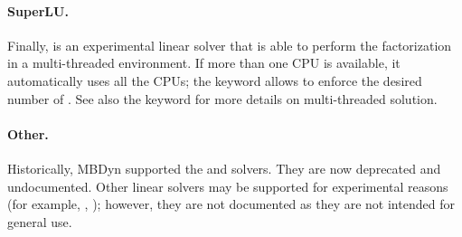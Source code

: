 \paragraph{SuperLU.}
Finally,  is an experimental linear solver that is able to perform
the factorization in a multi-threaded environment.
If more than one CPU is available, it automatically uses all the CPUs;
the keyword  allows to enforce the desired number of .
See also the  keyword for more details on multi-threaded
solution.

\begin{comment}
Another linear solver, that is available mostly for historical reasons, 
is \kw{harwell}, with a \nt{workspace\_size}
of $ \nt{numdofs}\times\nt{numdofs} $, but in certain cases the user
might prefer a smaller workspace, since the matrix is handled as sparse,
while sometimes a larger space is required, since when the matrix is
full, a little more space is required, due to extra storage needs when
the matrix fills up.
\end{comment}

\paragraph{Other.}
Historically, MBDyn supported the  and  solvers.
They are now deprecated and undocumented.
Other linear solvers may be supported for experimental reasons
(for example, , );
however, they are not documented as they are not intended for general use.


